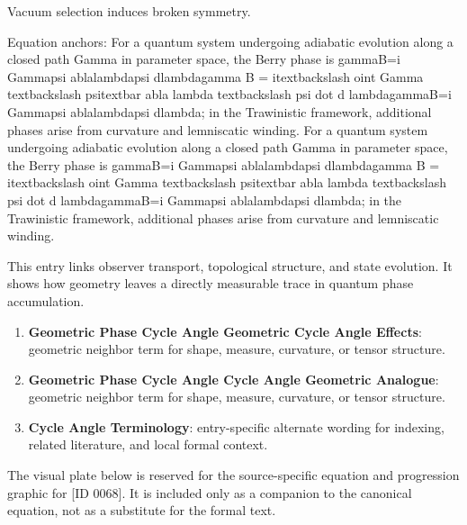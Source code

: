 Vacuum selection induces broken symmetry.

Equation anchors: For a quantum system undergoing adiabatic evolution along a closed path Gamma in parameter space, the Berry phase is gammaB=i Gammapsi  ablalambdapsi dlambdagamma B = itextbackslash oint Gamma textbackslash psitextbar abla lambda textbackslash psi dot d lambdagammaB=i Gammapsi  ablalambdapsi dlambda; in the Trawinistic framework, additional phases arise from curvature and lemniscatic winding. For a quantum system undergoing adiabatic evolution along a closed path Gamma in parameter space, the Berry phase is gammaB=i Gammapsi  ablalambdapsi dlambdagamma B = itextbackslash oint Gamma textbackslash psitextbar abla lambda textbackslash psi dot d lambdagammaB=i Gammapsi  ablalambdapsi dlambda; in the Trawinistic framework, additional phases arise from curvature and lemniscatic winding.

This entry links observer transport, topological structure, and state evolution. It shows how geometry leaves a directly measurable trace in quantum phase accumulation.
\endgroup

\begingroup\footnotesize\sloppy
\begin{enumerate}[leftmargin=1.35em,itemsep=1pt,topsep=1pt,parsep=0pt]
\item \textbf{Geometric Phase Cycle Angle Geometric Cycle Angle Effects}: geometric neighbor term for shape, measure, curvature, or tensor structure.
\item \textbf{Geometric Phase Cycle Angle Cycle Angle Geometric Analogue}: geometric neighbor term for shape, measure, curvature, or tensor structure.
\item \textbf{Cycle Angle Terminology}: entry-specific alternate wording for indexing, related literature, and local formal context.
\end{enumerate}
\endgroup

\begingroup\footnotesize\sloppy
The visual plate below is reserved for the source-specific equation and progression graphic for [ID 0068]. It is included only as a companion to the canonical equation, not as a substitute for the formal text.
\par\endgroup
\ifTZPDarkEdition
{}
\fi


